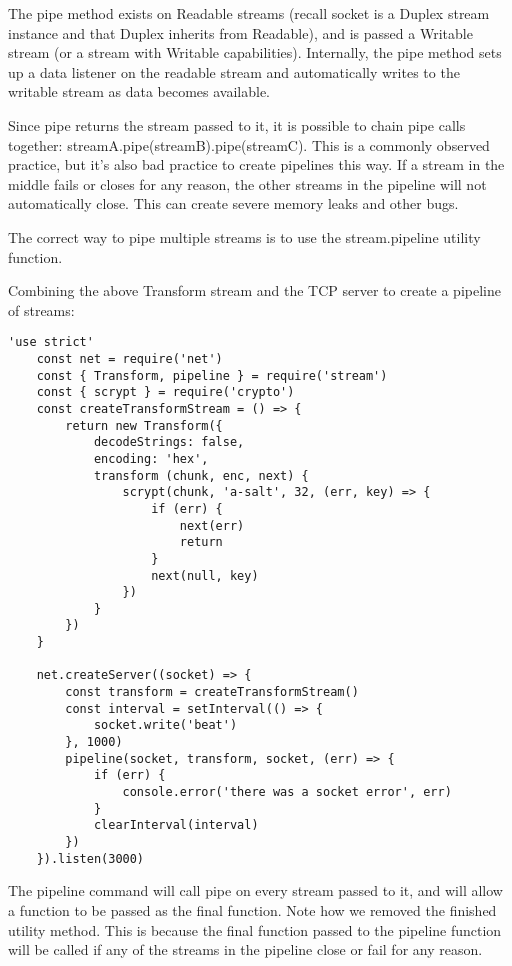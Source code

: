 \documentclass{scrartcl}
\begin{document}
The pipe method exists on Readable streams (recall socket is a Duplex stream instance and that Duplex inherits from Readable), and is passed a Writable stream (or a stream with Writable capabilities). Internally, the pipe method sets up a data listener on the readable stream and automatically writes to the writable stream as data becomes available.

Since pipe returns the stream passed to it, it is possible to chain pipe calls together: streamA.pipe(streamB).pipe(streamC). This is a commonly observed practice, but it's also bad practice to create pipelines this way. If a stream in the middle fails or closes for any reason, the other streams in the pipeline will not automatically close. This can create severe memory leaks and other bugs.

The correct way to pipe multiple streams is to use the stream.pipeline utility function.

Combining the above Transform stream and the TCP server to create a pipeline of streams:

\begin{lstlisting}[style=ES6]
    'use strict'
    const net = require('net')
    const { Transform, pipeline } = require('stream')
    const { scrypt } = require('crypto')
    const createTransformStream = () => {
        return new Transform({
            decodeStrings: false,
            encoding: 'hex',
            transform (chunk, enc, next) {
                scrypt(chunk, 'a-salt', 32, (err, key) => {
                    if (err) {
                        next(err)
                        return
                    }
                    next(null, key)
                })
            }
        })
    }

    net.createServer((socket) => {
        const transform = createTransformStream()
        const interval = setInterval(() => {
            socket.write('beat')
        }, 1000)
        pipeline(socket, transform, socket, (err) => {
            if (err) {
                console.error('there was a socket error', err)
            }
            clearInterval(interval)
        })
    }).listen(3000)

\end{lstlisting}

The pipeline command will call pipe on every stream passed to it, and will allow a function to be passed as the final function. Note how we removed the finished utility method. This is because the final function passed to the pipeline function will be called if any of the streams in the pipeline close or fail for any reason.
\end{document}
